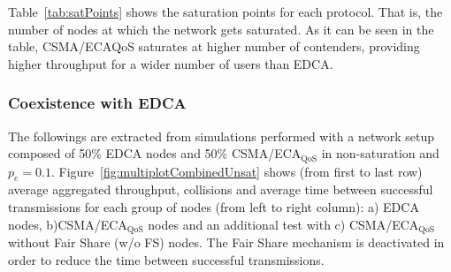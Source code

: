 Table~\ref{tab:satPoints} shows the saturation points for each protocol. That is, the number of nodes at which the network gets saturated. As it can be seen in the table, CSMA/ECA${\text{QoS}}$ saturates at higher number of contenders, providing higher throughput for a wider number of users than EDCA.

\subsubsection{Coexistence with EDCA}
	
The followings are extracted from simulations performed with a network setup composed of 50\% EDCA nodes and 50\% CSMA/ECA$_{\text{QoS}}$ in non-saturation and $p_e=0.1$. Figure~\ref{fig:multiplotCombinedUnsat} shows (from first to last row) average aggregated throughput, collisions and average time between successful transmissions for each group of nodes (from left to right column): a) EDCA nodes, b)CSMA/ECA$_{\text{QoS}}$ nodes and an additional test with c) CSMA/ECA$_{\text{QoS}}$ without Fair Share (w/o FS) nodes. The Fair Share mechanism is deactivated in order to reduce the time between successful transmissions.




